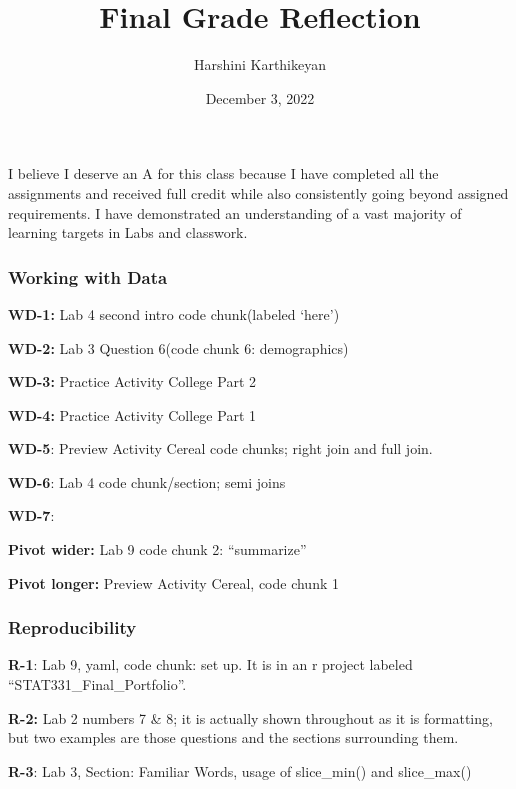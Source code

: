\documentclass[
  letterpaper,
  DIV=11,
  numbers=noendperiod]{scrartcl}
\title{Final Grade Reflection}
\author{Harshini Karthikeyan}
\date{December 3, 2022}
\begin{document}
\maketitle
\ifdefined\Shaded\renewenvironment{Shaded}{\begin{tcolorbox}[frame hidden, interior hidden, sharp corners, boxrule=0pt, borderline west={3pt}{0pt}{shadecolor}, breakable, enhanced]}{\end{tcolorbox}}\fi

I believe I deserve an A for this class because I have completed all the
assignments and received full credit while also consistently going
beyond assigned requirements. I have demonstrated an understanding of a
vast majority of learning targets in Labs and classwork.~

\hypertarget{working-with-data}{%
\subsubsection{Working with Data}\label{working-with-data}}

\textbf{WD-1:} Lab 4 second intro code chunk(labeled `here')~

\textbf{WD-2:} Lab 3 Question 6(code chunk 6: demographics)

\textbf{WD-3:} Practice Activity College Part 2

\textbf{WD-4:} Practice Activity College Part 1~

\textbf{WD-5}: Preview Activity Cereal code chunks; right join and full
join.~

\textbf{WD-6}: Lab 4 code chunk/section; semi joins

\textbf{WD-7}:~

\textbf{Pivot wider:} Lab 9 code chunk 2: ``summarize''

\textbf{Pivot longer:} Preview Activity Cereal, code chunk 1

\hypertarget{reproducibility}{%
\subsubsection{Reproducibility}\label{reproducibility}}

\textbf{R-1}: Lab 9, yaml, code chunk: set up. It is in an r project
labeled ``STAT331\_Final\_Portfolio''.

\textbf{R-2:} Lab 2 numbers 7 \& 8; it is actually shown throughout as
it is formatting, but two examples are those questions and the sections
surrounding them.~

\textbf{R-3}: Lab 3, Section: Familiar Words, usage of slice\_min() and
slice\_max()
\end{document}
